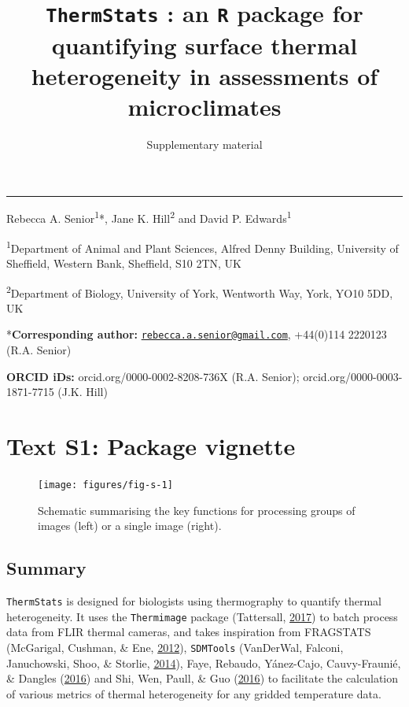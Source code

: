 \documentclass[12pt,british,a4paper,]{article}
\title{\texttt{ThermStats} : an \texttt{R} package for quantifying surface thermal heterogeneity in assessments of microclimates}
\subtitle{Supplementary material}
\author{}
\date{}
\begin{document}
\maketitle

\begin{center}\rule{0.5\linewidth}{\linethickness}\end{center}

Rebecca A. Senior\textsuperscript{1}*, Jane K. Hill\textsuperscript{2} and David P. Edwards\textsuperscript{1}

\textsuperscript{1}Department of Animal and Plant Sciences, Alfred Denny Building, University of Sheffield, Western Bank, Sheffield, S10 2TN, UK

\textsuperscript{2}Department of Biology, University of York, Wentworth Way, York, YO10 5DD, UK

*\textbf{Corresponding author:} \href{mailto:rebecca.a.senior@gmail.com}{\nolinkurl{rebecca.a.senior@gmail.com}}, +44(0)114 2220123 (R.A. Senior)

\textbf{ORCID iDs:} orcid.org/0000-0002-8208-736X (R.A. Senior); orcid.org/0000-0003-1871-7715 (J.K. Hill)

\pagebreak
\raggedright
\setcounter{tocdepth}{2}
\tableofcontents
\pagebreak

\hypertarget{text-s1-package-vignette}{%
\section{Text S1: Package vignette}\label{text-s1-package-vignette}}



\begin{figure}[H]

{\centering \texttt{[image: figures/fig-s-1]} 

}

\caption{Schematic summarising the key functions for processing groups of images (left) or a single image (right).}\label{fig:fig-2}
\end{figure}

\hypertarget{summary}{%
\subsection{Summary}\label{summary}}

\texttt{ThermStats} is designed for biologists using thermography to quantify thermal heterogeneity. It uses the \texttt{Thermimage} package (Tattersall, \protect\hyperlink{ref-tattersall_thermimage:_2017}{2017}) to batch process data from FLIR thermal cameras, and takes inspiration from FRAGSTATS (McGarigal, Cushman, \& Ene, \protect\hyperlink{ref-fragstats_2012}{2012}), \texttt{SDMTools} (VanDerWal, Falconi, Januchowski, Shoo, \& Storlie, \protect\hyperlink{ref-sdmtools_2014}{2014}), Faye, Rebaudo, Yánez-Cajo, Cauvy-Fraunié, \& Dangles (\protect\hyperlink{ref-faye_toolbox_2016}{2016}) and Shi, Wen, Paull, \& Guo (\protect\hyperlink{ref-shi_framework_2016}{2016}) to facilitate the calculation of various metrics of thermal heterogeneity for any gridded temperature data.
\end{document}

